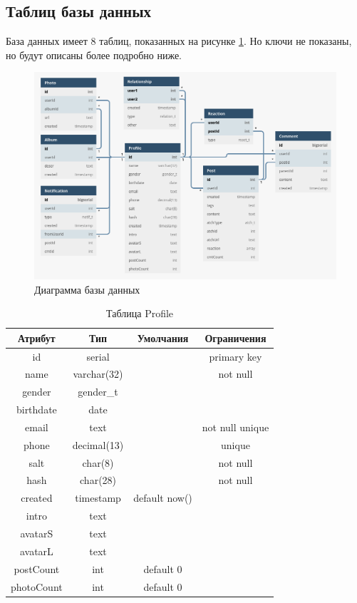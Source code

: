 \subsection*{Таблиц базы данных}

База данных имеет 8 таблиц, показанных на рисунке \ref{2.3}.
Но ключи не показаны, но будут описаны более подробно ниже.

\begin{figure}[ht!]
  \centering
  \includegraphics[width=\textwidth]{../db.png}
  \caption{Диаграмма базы данных}
  \label{2.3}
\end{figure}

\def\arraystretch{1}

\begin{table}[H]
  \centering
  \begin{tabular}{|c|c|c|c|}
      \hline
      \bfseries Атрибут & \bfseries Тип & \bfseries Умолчания & Ограничения \\
      \hline
id		&	serial && 		primary key \\
name	&	varchar(32)	&&not null \\
gender	&	gender\_t &&\\
birthdate&	date &&\\
email	&	text		&&not null	unique \\
phone	&	decimal(13)	&&unique \\
salt	&	char(8)		&&not null \\
hash	&	char(28)	&&not null \\
created	&	timestamp			&default now() &\\
intro	&	text &&\\
avatarS	&	text &&\\
avatarL	&	text &&\\
postCount&	int		&default 	0 &\\
photoCount&	int		&default 	0 &\\
      \hline
  \end{tabular}
  \caption{Таблица Profile}
\end{table}


